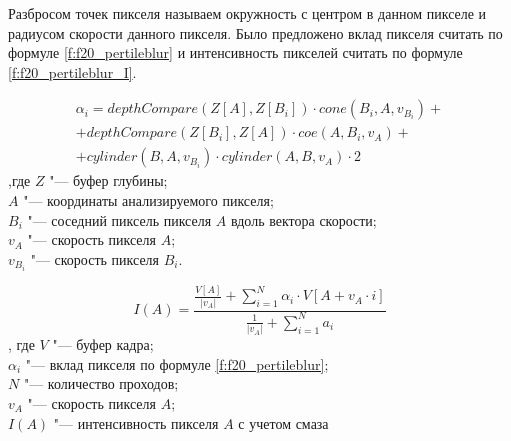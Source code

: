 Разбросом точек пикселя называем окружность с центром в данном пикселе и радиусом скорости данного пикселя. Было предложено вклад пикселя считать по формуле \eqref{f:f20_pertileblur} и интенсивность пикселей считать по формуле \eqref{f:f20_pertileblur_I}.
\begin{eqndesc}
    \begin{eqnarray}
        \label{f:f20_pertileblur}
        \alpha_i =
        depthCompare(Z[A], Z[B_i]) \cdot cone(B_i, A, v_{B_i}) + \\
        + depthCompare(Z[B_i], Z[A]) \cdot coe(A, B_i, v_A) + \\
        + cylinder(B,A,v_{B_i}) \cdot cylinder(A,B, v_A) \cdot 2
    \end{eqnarray}
    ,где
    $Z$ "--- буфер глубины; \\
    $A$ "--- координаты анализируемого пикселя; \\
    $B_i$ "--- соседний пиксель пикселя $A$ вдоль вектора скорости; \\ 
    $v_A$ "--- скорость пикселя $A$; \\
    $v_{B_i}$ "--- скорость пикселя $B_i$. \\

\end{eqndesc}
\par 

\begin{eqndesc}
    \begin{equation} \label{f:f20_pertileblur_I}
        I(A) = \frac{\frac{V[A]}{|v_A|} +
        \sum_{i=1}^N
        {\alpha_i \cdot V[A + v_A \cdot i]}
        }{\frac{1}{|v_A|} + \sum_{i=1}^N  a_i}
    \end{equation}
    , где  $V$ "--- буфер кадра;\\
    $\alpha_i$ "--- вклад пикселя по формуле \eqref{f:f20_pertileblur};\\
    $N$ "--- количество проходов;\\
    $v_A$ "--- скорость пикселя $A$; \\
    $I(A)$ "--- интенсивность пикселя $A$ с учетом смаза
\end{eqndesc}


